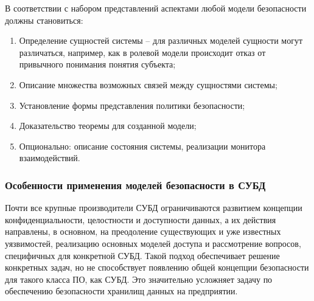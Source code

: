 В соответствии с набором представлений аспектами любой модели безопасности должны становиться: 
\begin{enumerate}
    \item Определение сущностей системы -- для различных моделей сущности могут различаться, например, 
    как в ролевой модели происходит отказ от привычного понимания понятия субъекта;

    \item Описание множества возможных связей между сущностями системы;

    \item Установление формы представления политики безопасности;

    \item Доказательство теоремы для созданной модели;

    \item Опционально: описание состояния системы, реализации монитора взаимодействий.
\end{enumerate}

\subsubsection{Особенности применения моделей безопасности в СУБД}

Почти все крупные производители СУБД ограничиваются развитием концепции конфиденциальности, целостности 
и доступности данных, а их действия направлены, в основном, на преодоление существующих и уже известных 
уязвимостей, реализацию основных моделей доступа и рассмотрение вопросов, специфичных для конкретной СУБД. 
Такой подход обеспечивает решение конкретных задач, но не способствует появлению общей концепции 
безопасности для такого класса ПО, как СУБД. Это значительно усложняет задачу по обеспечению безопасности 
хранилищ данных на предприятии.

